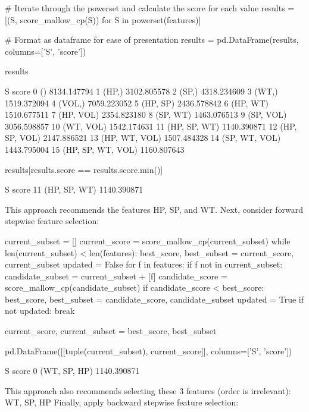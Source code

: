 \begin{python}
# Iterate through the powerset and calculate the score for each value
results = [(S, score_mallow_cp(S)) for S in powerset(features)]
    
# Format as dataframe for ease of presentation
results = pd.DataFrame(results, columns=['S', 'score'])
\end{python}

\begin{python}
results
\end{python}
\begin{console}
                    S        score
0                  ()  8134.147794
1               (HP,)  3102.805578
2               (SP,)  4318.234609
3               (WT,)  1519.372094
4              (VOL,)  7059.223052
5            (HP, SP)  2436.578842
6            (HP, WT)  1510.677511
7           (HP, VOL)  2354.823180
8            (SP, WT)  1463.076513
9           (SP, VOL)  3056.598857
10          (WT, VOL)  1542.174631
11       (HP, SP, WT)  1140.390871
12      (HP, SP, VOL)  2147.886521
13      (HP, WT, VOL)  1507.484328
14      (SP, WT, VOL)  1443.795004
15  (HP, SP, WT, VOL)  1160.807643
\end{console}
       

\begin{python}
results[results.score == results.score.min()]
\end{python}
\begin{console}
               S        score
11  (HP, SP, WT)  1140.390871
\end{console}
This approach recommends the features HP, SP, and WT.
Next, consider forward stepwise feature selection:

\begin{python}
current_subset = []
current_score = score_mallow_cp(current_subset)
while len(current_subset) < len(features):
    best_score, best_subset = current_score, current_subset
    updated = False
    for f in features:
        if f not in current_subset:
            candidate_subset = current_subset + [f]
            candidate_score = score_mallow_cp(candidate_subset)
            if candidate_score < best_score:
                best_score, best_subset = candidate_score, candidate_subset
                updated = True              
    if not updated:
        break
        
    current_score, current_subset = best_score, best_subset
    
pd.DataFrame([[tuple(current_subset), current_score]], columns=['S', 'score'])
\end{python}
\begin{console}
              S        score
0  (WT, SP, HP)  1140.390871
\end{console}
This approach also recommends selecting these 3 features (order is
irrelevant): WT, SP, HP
Finally, apply backward stepwise feature selection:

